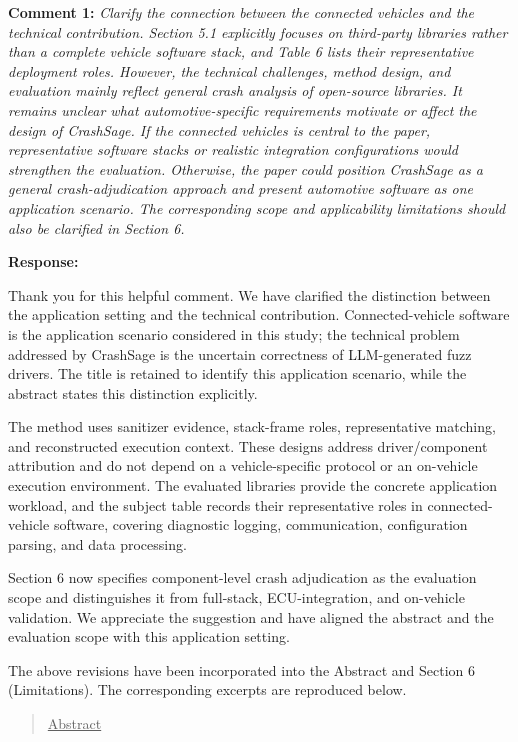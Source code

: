 \documentclass[onecolumn,11pt]{article}
\newcommand{\secc}[2]{\par\mySep \noindent \textsf{\textbf{#1 }}\textit{#2}\par}
\newcommand{\secr}[2]{\par\mySep \noindent \textsf{\textbf{#1 }}{#2}\par}
\newcommand{\nc}[2]{\needspace{5\baselineskip}\begin{quote}\underline{#1}\\ \nopagebreak[4]{\leavevmode\color{blue}{``#2"}}\end{quote}}
\newcommand{\mySep}{\vspace{8pt}}
\begin{document}
\secc{Comment 1:}{Clarify the connection between the connected vehicles and the technical contribution. Section 5.1 explicitly focuses on third-party libraries rather than a complete vehicle software stack, and Table 6 lists their representative deployment roles. However, the technical challenges, method design, and evaluation mainly reflect general crash analysis of open-source libraries. It remains unclear what automotive-specific requirements motivate or affect the design of CrashSage. If the connected vehicles is central to the paper, representative software stacks or realistic integration configurations would strengthen the evaluation. Otherwise, the paper could position CrashSage as a general crash-adjudication approach and present automotive software as one application scenario. The corresponding scope and applicability limitations should also be clarified in Section 6.}
\secr{Response:}{Thank you for this helpful comment. We have clarified the distinction between the application setting and the technical contribution. Connected-vehicle software is the application scenario considered in this study; the technical problem addressed by CrashSage is the uncertain correctness of LLM-generated fuzz drivers. The title is retained to identify this application scenario, while the abstract states this distinction explicitly.

The method uses sanitizer evidence, stack-frame roles, representative matching, and reconstructed execution context. These designs address driver/component attribution and do not depend on a vehicle-specific protocol or an on-vehicle execution environment. The evaluated libraries provide the concrete application workload, and the subject table records their representative roles in connected-vehicle software, covering diagnostic logging, communication, configuration parsing, and data processing.

Section 6 now specifies component-level crash adjudication as the evaluation scope and distinguishes it from full-stack, ECU-integration, and on-vehicle validation. We appreciate the suggestion and have aligned the abstract and the evaluation scope with this application setting.

The above revisions have been incorporated into the Abstract and Section 6 (Limitations). The corresponding excerpts are reproduced below.}

\nc{Abstract}{Connected-vehicle software relies on third-party open-source libraries, making it a relevant application setting for studying crash adjudication in LLM-assisted fuzzing.}
\end{document}
